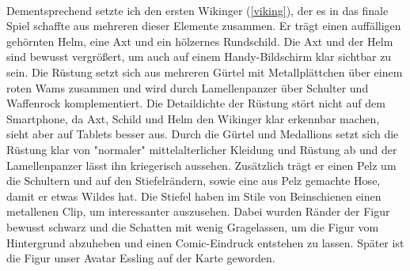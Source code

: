 \documentclass[extern,palatino]{cgBA}
\begin{document}
\\Dementsprechend setzte ich den ersten Wikinger (\ref{viking}), der es in das finale Spiel schaffte aus mehreren dieser Elemente zusammen. Er trägt einen auffälligen gehörnten Helm, eine Axt und ein hölzernes Rundschild. Die Axt und der Helm sind bewusst vergrößert, um auch auf einem Handy-Bildschirm klar sichtbar zu sein. Die Rüstung setzt sich aus mehreren Gürtel mit Metallplättchen über einem roten Wams zusammen und wird durch Lamellenpanzer über Schulter und Waffenrock komplementiert. Die Detaildichte der Rüstung stört nicht auf dem Smartphone, da Axt, Schild und Helm den Wikinger klar erkennbar machen, sieht aber auf Tablets besser aus. Durch die Gürtel und Medallions setzt sich die Rüstung klar von "normaler" mittelalterlicher Kleidung und Rüstung ab und der Lamellenpanzer lässt ihn kriegerisch aussehen. Zusätzlich trägt er einen Pelz um die Schultern und auf den Stiefelrändern, sowie eine aus Pelz gemachte Hose, damit er etwas Wildes hat. Die Stiefel haben im Stile von Beinschienen einen metallenen Clip, um interessanter auszusehen. Dabei wurden Ränder der Figur bewusst schwarz und die Schatten mit wenig Gragelassen, um die Figur vom Hintergrund abzuheben und einen Comic-Eindruck entstehen zu lassen. Später ist die Figur unser Avatar Essling auf der Karte geworden.

\newpage
\end{document}
